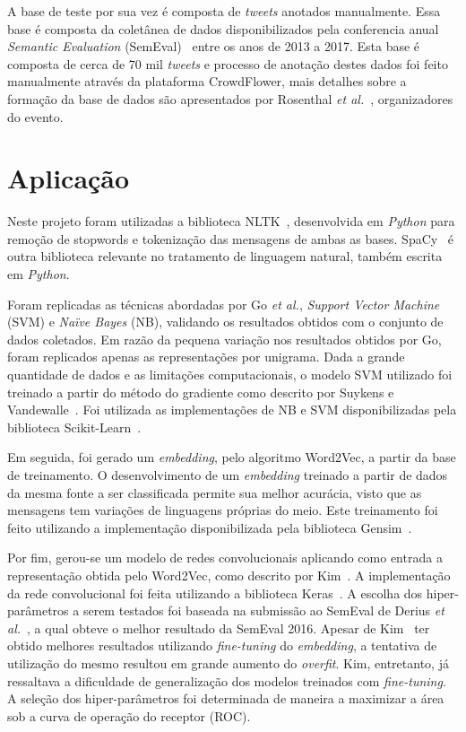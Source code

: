 A base de teste por sua vez é composta de \textit{tweets} anotados manualmente.
Essa base é composta da coletânea de dados disponibilizados pela conferencia anual \textit{Semantic Evaluation}
(SemEval)~\cite{semeval17} entre os anos de 2013 a 2017.
Esta base é composta de cerca de 70 mil \textit{tweets} e processo de anotação destes dados foi feito manualmente através
da plataforma CrowdFlower, mais detalhes sobre a formação da base de dados são apresentados por Rosenthal
\textit{et al.}~\cite{rosenthal17}, organizadores do evento.

\section{Aplicação}

Neste projeto foram utilizadas a biblioteca NLTK~\cite{nltk}, desenvolvida em \textit{Python} para remoção de stopwords
e tokenização das mensagens de ambas as bases.
SpaCy~\cite{spacy} é outra biblioteca relevante no tratamento de linguagem natural, também escrita em \textit{Python}.

Foram replicadas as técnicas abordadas por Go \textit{et al.}, \textit{Support Vector Machine} (SVM) e
\textit{Naïve Bayes} (NB), validando os resultados obtidos com o conjunto de dados coletados.
Em razão da pequena variação nos resultados obtidos por Go, foram replicados apenas as representações por unigrama.
Dada a grande quantidade de dados e as limitações computacionais, o modelo SVM utilizado foi treinado a partir do método
do gradiente como descrito por Suykens e Vandewalle~\cite{suykens99}.
Foi utilizada as implementações de NB e SVM disponibilizadas pela biblioteca Scikit-Learn~\cite{sklearn}.

Em seguida, foi gerado um \textit{embedding}, pelo algoritmo Word2Vec, a partir da base de treinamento.
O desenvolvimento de um \textit{embedding} treinado a partir de dados da mesma fonte a ser classificada permite sua
melhor acurácia, visto que as mensagens tem variações de linguagens próprias do meio.
Este treinamento foi feito utilizando a implementação disponibilizada pela biblioteca Gensim~\cite{gensim}.

Por fim, gerou-se um modelo de redes convolucionais aplicando como entrada a representação obtida pelo Word2Vec, como
descrito por Kim~\cite{kim14}.
A implementação da rede convolucional foi feita utilizando a biblioteca Keras~\cite{keras}.
A escolha dos hiper-parâmetros a serem testados foi baseada na submissão ao SemEval de Derius
\textit{et al.}~\cite{deriu16}, a qual obteve o melhor resultado da SemEval 2016.
Apesar de Kim~\cite{kim14} ter obtido melhores resultados utilizando \textit{fine-tuning} do \textit{embedding}, a
tentativa de utilização do mesmo resultou em grande aumento do \textit{overfit}.
Kim, entretanto, já ressaltava a dificuldade de generalização dos modelos treinados com \textit{fine-tuning}.
A seleção dos hiper-parâmetros foi determinada de maneira a maximizar a área sob a curva de operação do receptor (ROC).


